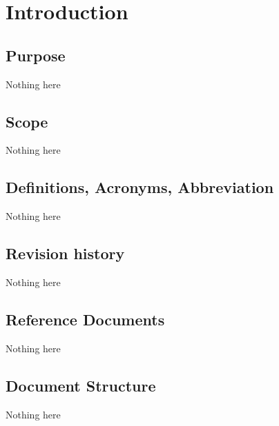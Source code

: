 \section{Introduction}\label{intro}

\subsection{Purpose}
Nothing here

\subsection{Scope}
Nothing here

\subsection{Definitions, Acronyms, Abbreviation}
Nothing here

\subsection{Revision history}
Nothing here

\subsection{Reference Documents}
Nothing here

\subsection{Document Structure}
Nothing here
